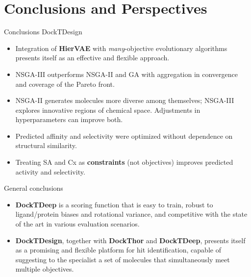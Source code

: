 \documentclass[aspectratio=169,xcolor=dvipsnames]{beamer}
\begin{document}
\section{Conclusions and Perspectives}


\begin{frame}{Conclusions \hfill {\footnotesize \alert{DockTDesign}}}

    \begin{itemize}
        \item Integration of \textbf{HierVAE} with \textit{many}-objective evolutionary algorithms presents itself as an effective and flexible approach.

        \item NSGA-III outperforms NSGA-II and GA with aggregation in convergence and coverage of the Pareto front.

        \item NSGA-II generates molecules more diverse among themselves; NSGA-III explores innovative regions of chemical space. Adjustments in hyperparameters can improve both.

        \item Predicted affinity and selectivity were optimized without dependence on structural similarity.

        \item Treating SA and Cx as \textbf{constraints} (not objectives) improves predicted activity and selectivity.

    \end{itemize}

\end{frame}


\begin{frame}{General conclusions}
    \begin{itemize}
        \item \textbf{DockTDeep} is a scoring function that is easy to train, robust to ligand/protein biases and rotational variance, and competitive with the state of the art in various evaluation scenarios.
        \item \textbf{DockTDesign}, together with \textbf{DockThor} and \textbf{DockTDeep}, presents itself as a promising and flexible platform for hit identification, capable of suggesting to the specialist a set of molecules that simultaneously meet multiple objectives.
    \end{itemize}
\end{frame}
\end{document}

